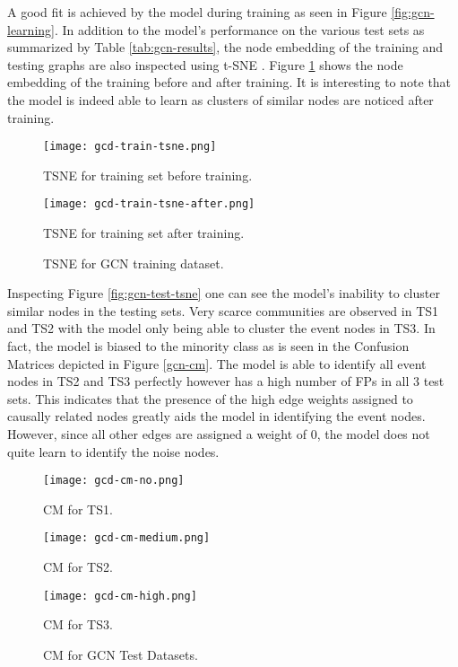 A good fit is achieved by the model during training as seen in Figure
\ref{fig:gcn-learning}. In addition to the model's performance on the
various test sets as summarized by Table \ref{tab:gcn-results}, the
node embedding of the training and testing graphs are also inspected
using t-SNE \cite{maaten2008visualizing}. Figure
\ref{fig:gcn-train-tsne} shows the node embedding of the training
before and after training. It is interesting to note that the model is
indeed able to learn as clusters of similar nodes are noticed after
training.

\begin{figure}[htb]
  \centering
  \begin{minipage}{0.49\textwidth}
    \centering
    \texttt{[image: gcd-train-tsne.png]}
    \caption{TSNE for training set before training.}
  \end{minipage}
  \begin{minipage}{0.49\textwidth}
    \centering
    \texttt{[image: gcd-train-tsne-after.png]}
    \caption{TSNE for training set after training.}
  \end{minipage}
  \caption{TSNE for GCN training dataset.}
  \label{fig:gcn-train-tsne}
\end{figure}

Inspecting Figure \ref{fig:gcn-test-tsne} one can see the model's
inability to cluster similar nodes in the testing sets. Very scarce
communities are observed in TS1 and TS2 with the model only being able
to cluster the event nodes in TS3. In fact, the model is biased to the
minority class as is seen in the Confusion Matrices depicted in Figure
\ref{gcn-cm}. The model is able to identify all event nodes in TS2 and
TS3 perfectly however has a high number of FPs in all 3 test sets.
This indicates that the presence of the high edge weights assigned to
causally related nodes greatly aids the model in identifying the event
nodes. However, since all other edges are assigned a weight of 0, the
model does not quite learn to identify the noise nodes.

\begin{figure}[htb]
  \centering
  \begin{minipage}{0.32\textwidth}
    \centering
    \texttt{[image: gcd-cm-no.png]}
    \caption{CM for TS1.}
  \end{minipage}
  \begin{minipage}{0.32\textwidth}
    \centering
    \texttt{[image: gcd-cm-medium.png]}
    \caption{CM for TS2.}
  \end{minipage}
  \begin{minipage}{0.32\textwidth}
    \centering
    \texttt{[image: gcd-cm-high.png]}
    \caption{CM for TS3.}
  \end{minipage}
  \caption{CM for GCN Test Datasets.}
  \label{fig:gcn-cm}
\end{figure}

